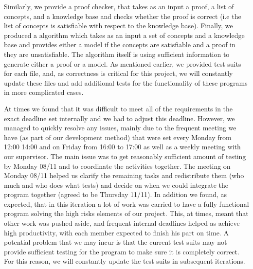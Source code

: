 Similarly, we provide a proof checker, that takes as an input a proof, a list of concepts, and a knowledge base and checks whether the proof is correct (i.e the list of concepts is satisfiable with respect to the knowledge base). Finally, we produced a algorithm which takes as an input a set of concepts and a knowledge base and provides either a model if the concepts are satisfiable and a proof in they are unsatisfiable. The algorithm itself is using sufficient information to generate either a proof or a model. As mentioned earlier, we provided test suits for each file, and, as correctness is critical for this project, we will constantly update these files and add additional tests for the functionality of these programs in more complicated cases.  

At times we found that it was difficult to meet all of the requirements in the exact deadline set internally and we had to adjust this deadline. However, we managed to quickly resolve any issues, mainly due to the frequent meeting we have (as part of our development method) that were set every Monday from 12:00 14:00 and on Friday from 16:00 to 17:00 as well as a weekly meeting with our supervisor. The main issue was to get reasonably sufficient amount of testing by Monday 08/11 and to coordinate the activities together. The meeting on Monday 08/11 helped us clarify the remaining tasks and redistribute them (who much and who does what tests) and decide on when we could integrate the program together (agreed to be Thursday 11/11). In addition we found, as expected, that in this iteration a lot of work was carried to have a fully functional program solving the high risks elements of our project. This, at times, meant that other work was pushed aside, and frequent internal deadlines helped as achieve high productivity, with each member expected to finish his part on time. A potential problem that we may incur is that the current test suits may not provide sufficient testing for the program to make sure it is completely correct. For this reason, we will constantly update the test suits in subsequent iterations.

